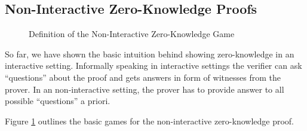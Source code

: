 \subsection{Non-Interactive Zero-Knowledge Proofs}
\begin{figure}
\centering


\caption{Definition of the Non-Interactive Zero-Knowledge Game}
    \label{fig:nizk}
\end{figure}

So far, we have shown the basic intuition behind showing zero-knowledge in an interactive setting.
Informally speaking in interactive settings the verifier can ask ``questions'' about the proof and gets answers in form of witnesses from the prover.
In an non-interactive setting, the prover has to provide answer to all possible ``questions'' a priori.


Figure \ref{fig:nizk} outlines the basic games for the non-interactive zero-knowledge proof.



